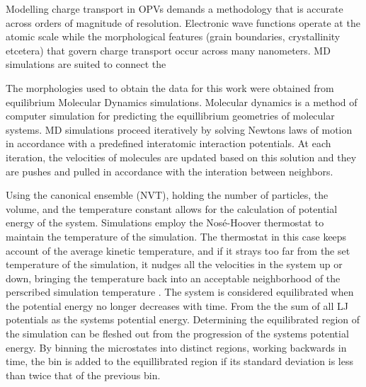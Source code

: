 
Modelling charge transport in OPVs demands a methodology that is accurate across orders of magnitude of
resolution. Electronic wave functions operate at the atomic scale while the morphological features (grain
boundaries, crystallinity etcetera) that govern charge transport occur across many nanometers. MD simulations
are suited to connect the 

The morphologies used to
obtain the data for this work were obtained from equilibrium Molecular Dynamics simulations. 
Molecular dynamics is a method of computer simulation for predicting the equillibrium geometries of molecular
systems. MD simulations proceed iteratively by solving Newtons laws of motion
in accordance with a predefined interatomic interaction potentials.
At each iteration, the velocities of molecules are
updated based on this solution and they are pushes and pulled in accordance with
the interation between neighbors.

Using the canonical ensemble (NVT), holding the number of
particles, the volume, and the temperature constant allows for the calculation of 
potential energy of the system.  
Simulations employ the Nos\'{e}-Hoover thermostat to maintain the temperature of the simulation. 
The thermostat in this case keeps account of the average kinetic temperature, and if it strays too far from the set temperature of the
simulation, it nudges all the velocities in the system up or down, bringing the temperature back into an
acceptable neighborhood of the perscribed simulation temperature \cite{Martyna1994d}\cite{Cao1996}.
The system is considered equilibrated when the potential energy no longer decreases with time. 
From the the sum of all LJ potentials as the systems potential energy. Determining the equilibrated region of the
simulation can be fleshed out from the progression of the systems potential energy. By binning the microstates
into distinct regions, working backwards in time, the bin is added to the equillibrated region if its standard
deviation is less than twice that of the previous bin. \cite{Henry2017a}

